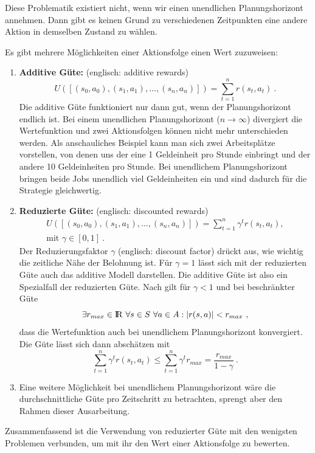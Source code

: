 \documentclass[a4paper]{IEEEtran}
\def\IR{\mathrm{I\hspace{-2pt}R}} %
\begin{document}
Diese Problematik existiert nicht, wenn wir einen unendlichen Planungshorizont annehmen. Dann gibt es keinen Grund zu verschiedenen Zeitpunkten eine andere Aktion in demselben Zustand zu wählen.

Es gibt mehrere Möglichkeiten einer Aktionsfolge einen Wert zuzuweisen:
\begin{enumerate}
	\item \textbf{Additive Güte:} (englisch: additive rewards)
		\begin{equation}
			U([ (s_0, a_0), (s_1, a_1), ..., (s_n, a_n)]) = \sum\limits_{t=1}^n r(s_t, a_t)\ .
		\end{equation}
		Die additive Güte funktioniert nur dann gut, wenn der Planungshorizont endlich ist. Bei einem unendlichen Planungshorizont ($n \rightarrow \infty$) divergiert die Wertefunktion und zwei Aktionsfolgen können nicht mehr unterschieden werden. Als anschauliches Beispiel kann man sich zwei Arbeitsplätze vorstellen, von denen uns der eine 1 Geldeinheit pro Stunde einbringt und der andere 10 Geldeinheiten pro Stunde. Bei unendlichem Planungshorizont bringen beide Jobs unendlich viel Geldeinheiten ein und sind dadurch für die Strategie gleichwertig.
	\item \textbf{Reduzierte Güte:} (englisch: discounted rewards)
		\begin{equation}
			\begin{split}
				U([ (s_0, a_0), (s_1, a_1), ..., (s_n, a_n)]) = \sum\limits_{t=1}^n \gamma^t r(s_t, a_t),\\
				\text{mit }\gamma \in [0,1]\ .
			\end{split}
		\end{equation}
		Der Reduzierungsfaktor $\gamma$ (englisch: discount factor) drückt aus, wie wichtig die zeitliche Nähe der Belohnung ist. Für $\gamma=1$ lässt sich mit der reduzierten Güte auch das additive Modell darstellen. Die additive Güte ist also ein Spezialfall der reduzierten Güte. Nach \cite{thrun2005probabilistic} gilt für $\gamma < 1$ und bei beschränkter Güte 
		\begin{equation}
			\exists r_{max} \in \IR\ \forall s \in S\ \forall a \in A: |r(s,a)| < r_{max} \ ,
		\end{equation}
		dass die Wertefunktion auch bei unendlichem Planungshorizont konvergiert. Die Güte lässt sich dann abschätzen mit  
		\begin{equation}
			\sum\limits_{t=1}^n \gamma^t r(s_t, a_t) \leq \sum\limits_{t=1}^n \gamma^t r_{max} = \frac{r_{max}}{1-\gamma}  \ .
		\end{equation}
	\item
		Eine weitere Möglichkeit bei unendlichem Planungshorizont wäre die durchschnittliche Güte pro Zeitschritt zu betrachten, sprengt aber den Rahmen dieser Ausarbeitung.
\end{enumerate}
Zusammenfassend ist die Verwendung von reduzierter Güte mit den wenigsten Problemen verbunden, um mit ihr den Wert einer Aktionsfolge zu bewerten.
\end{document}
